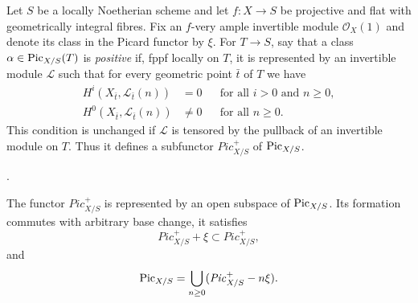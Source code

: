 \noindent
Let $S$ be a locally Noetherian scheme and let $f : X \to S$ be projective
and flat with geometrically integral fibres. Fix an $f$-very ample invertible
module $\mathcal{O}_X(1)$ and denote its class in the Picard functor by $\xi$.
For $T \to S$, say that a class $\alpha \in \mathrm{Pic}_{X/S}(T)$ is
\emph{positive} if, fppf locally on $T$, it is represented by an invertible
module $\mathcal{L}$ such that for every geometric point $\bar t$ of $T$
we have
\begin{align*}
H^i(X_{\bar t}, \mathcal{L}_{\bar t}(n)) & = 0
&& \text{for all }i > 0\text{ and }n \geq 0, \\
H^0(X_{\bar t}, \mathcal{L}_{\bar t}(n)) & \neq 0
&& \text{for all }n \geq 0.
\end{align*}
This condition is unchanged if $\mathcal{L}$ is tensored by the pullback of
an invertible module on $T$. Thus it defines a subfunctor
$\mathit{Pic}^+_{X/S}$ of $\mathrm{Pic}_{X/S}$.

\begin{lemma}
\label{lemma-positive-picard-open}
\begin{reference}
\cite[Expos\'e 232, Section 5, pp. 154--155]{FGA}.
\end{reference}
The functor $\mathit{Pic}^+_{X/S}$ is represented by an open subspace of
$\mathrm{Pic}_{X/S}$. Its formation commutes with arbitrary base change,
it satisfies
$$
\mathit{Pic}^+_{X/S} + \xi \subset \mathit{Pic}^+_{X/S},
$$
and
\begin{equation}
\label{equation-picard-covered-positive-translates}
\mathrm{Pic}_{X/S} =
\bigcup_{n \geq 0}(\mathit{Pic}^+_{X/S} - n\xi).
\end{equation}
\end{lemma}

